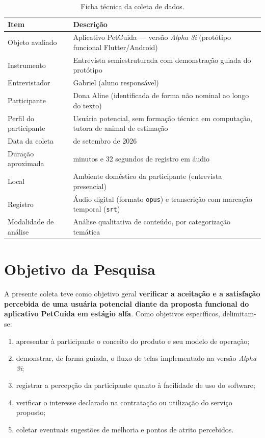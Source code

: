 \documentclass[12pt,a4paper]{article}
\newcommand{\entrevistador}{Gabriel}
\newcommand{\participante}{Dona Aline}
\begin{document}
\begin{table}[h!]
\centering
\begin{tabular}{@{}>{\raggedright\arraybackslash}p{5.2cm}>{\raggedright\arraybackslash}p{8.5cm}@{}}
\toprule
\textbf{Item} & \textbf{Descrição} \\
\midrule
Objeto avaliado & Aplicativo PetCuida --- versão \textit{Alpha 3i} (protótipo funcional Flutter/Android) \\
Instrumento & Entrevista semiestruturada com demonstração guiada do protótipo \\
Entrevistador & \entrevistador{} (aluno responsável) \\
Participante & \participante{} (identificada de forma não nominal ao longo do texto) \\
Perfil do participante & Usuária potencial, sem formação técnica em computação, tutora de animal de estimação \\
Data da coleta & 16 de setembro de 2026 \\
Duração aproximada & 7 minutos e 32 segundos de registro em áudio \\
Local & Ambiente doméstico da participante (entrevista presencial) \\
Registro & Áudio digital (formato \texttt{opus}) e transcrição com marcação temporal (\texttt{srt}) \\
Modalidade de análise & Análise qualitativa de conteúdo, por categorização temática \\
\bottomrule
\end{tabular}
\caption{Ficha técnica da coleta de dados.}
\end{table}

\section{Objetivo da Pesquisa}

A presente coleta teve como objetivo geral \textbf{verificar a aceitação e a satisfação
percebida de uma usuária potencial diante da proposta funcional do aplicativo PetCuida em
estágio alfa}. Como objetivos específicos, delimitam-se:

\begin{enumerate}[label=\alph*)]
  \item apresentar à participante o conceito do produto e seu modelo de operação;
  \item demonstrar, de forma guiada, o fluxo de telas implementado na versão \textit{Alpha 3i};
  \item registrar a percepção da participante quanto à facilidade de uso do software;
  \item verificar o interesse declarado na contratação ou utilização do serviço proposto;
  \item coletar eventuais sugestões de melhoria e pontos de atrito percebidos.
\end{enumerate}
\end{document}
